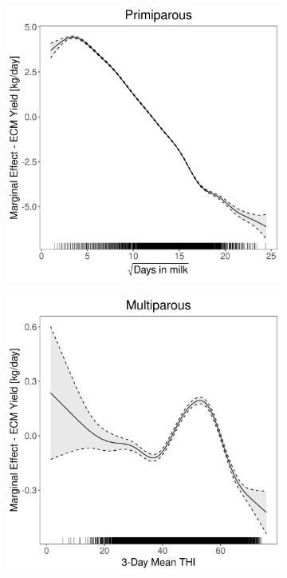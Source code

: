 \begin{figure}[H]
\begin{subfigure}[b]{0.45\textwidth}
    \end{subfigure}
    \hspace{0.05\textwidth} %
    \begin{subfigure}[b]{0.45\textwidth}
        \centering
        \includegraphics[width=\textwidth]{thesis/figures/models/ecm/after2010/si_ecm_after2010/si_ecm_after2010_marginal_dim_milk_primi.png}
    \end{subfigure}
    \begin{subfigure}[b]{0.45\textwidth}
        \centering
        \includegraphics[width=\textwidth]{thesis/figures/models/ecm/after2010/si_ecm_after2010/si_ecm_after2010_marginal_thi_milk_multi.png}

\end{subfigure}
\end{figure}
